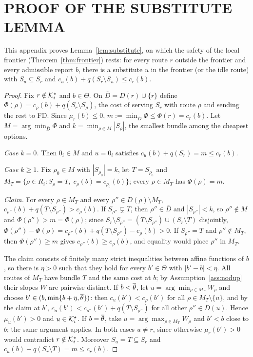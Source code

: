 \chapter{PROOF OF THE SUBSTITUTE LEMMA}
\label{app:proofs}

This appendix proves Lemma~\ref{lem:substitute}, on which the safety of the
local frontier (Theorem~\ref{thm:frontier}) rests: for every route $r$
outside the frontier and every admissible report $b$, there is a substitute
$u$ in the frontier (or the idle route) with $S_u\subseteq S_r$ and
$c_u(b)+q(S_r\setminus S_u)\le c_r(b)$.

\begin{proof}
Fix $r\notin\mathcal{K}^\star_i$ and $b\in\Theta$. On $\bar D=D(r)\cup\{r\}$ define
$\Phi(\rho)=c_\rho(b)+q(S_r\setminus S_\rho)$, the cost of serving $S_r$ with
route $\rho$ and sending the rest to FD. Since $\mu_r(b)\le 0$,
$m:=\min_{\bar D}\Phi\le\Phi(r)=c_r(b)$. Let $M=\arg\min_{\bar D}\Phi$ and
$k=\min_{\rho\in M}|S_\rho|$, the smallest bundle among the cheapest options.

\emph{Case $k=0$.} Then $0_i\in M$ and $u=0_i$ satisfies
$c_u(b)+q(S_r)=m\le c_r(b)$.

\emph{Case $k\ge 1$.} Fix $\rho_0\in M$ with $|S_{\rho_0}|=k$, let
$T=S_{\rho_0}$ and $M_T=\{\rho\in R_i:S_\rho=T,\;c_\rho(b)=c_{\rho_0}(b)\}$;
every $\rho\in M_T$ has $\Phi(\rho)=m$.

\emph{Claim.} For every $\rho\in M_T$ and every $\rho''\in D(\rho)\setminus M_T$,
$c_{\rho''}(b)+q(T\setminus S_{\rho''})>c_\rho(b)$.
If $S_{\rho''}\subsetneq T$, then $\rho''\in\bar D$ and $|S_{\rho''}|<k$, so
$\rho''\notin M$ and $\Phi(\rho'')>m=\Phi(\rho)$; since
$S_r\setminus S_{\rho''}=(T\setminus S_{\rho''})\cup(S_r\setminus T)$
disjointly, $\Phi(\rho'')-\Phi(\rho)=c_{\rho''}(b)+q(T\setminus S_{\rho''})-c_\rho(b)>0$.
If $S_{\rho''}=T$ and $\rho''\notin M_T$, then $\Phi(\rho'')\ge m$ gives
$c_{\rho''}(b)\ge c_\rho(b)$, and equality would place $\rho''$ in $M_T$.

The claim consists of finitely many strict inequalities between affine
functions of $b$, so there is $\eta>0$ such that they hold for every
$b'\in\Theta$ with $|b'-b|<\eta$. All routes of $M_T$ have bundle $T$ and the
same cost at $b$; by Assumption~\ref{ass:nodup} their slopes $W$ are
pairwise distinct. If $b<\overline{\theta}$, let $u=\arg\min_{\rho\in M_T}W_\rho$ and choose
$b'\in(b,\min\{b+\eta,\overline{\theta}\})$: then $c_u(b')<c_\rho(b')$ for all
$\rho\in M_T\setminus\{u\}$, and by the claim at $b'$,
$c_u(b')<c_{\rho''}(b')+q(T\setminus S_{\rho''})$ for all other
$\rho''\in D(u)$. Hence $\mu_u(b')>0$ and $u\in\mathcal{K}^\star_i$. If $b=\overline{\theta}$, take
$u=\arg\max_{\rho\in M_T}W_\rho$ and $b'<b$ close to $b$; the same argument
applies. In both cases $u\ne r$, since otherwise $\mu_r(b')>0$ would
contradict $r\notin\mathcal{K}^\star_i$. Moreover $S_u=T\subseteq S_r$ and
$c_u(b)+q(S_r\setminus T)=m\le c_r(b)$.
\end{proof}
